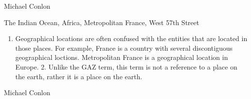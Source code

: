 \documentclass[letterpaper,10pt,english]{sphinxmanual}
\begin{document}
\begin{sphinxShadowBox}

\sphinxAtStartPar
Michael Conlon 
\end{sphinxShadowBox}

\begin{sphinxShadowBox}

\sphinxAtStartPar
The Indian Ocean, Africa, Metropolitan France, West 57th Street
\end{sphinxShadowBox}

\begin{sphinxShadowBox}
\begin{enumerate}
%
\item {} 
\sphinxAtStartPar
Geographical locations are often confused with the entities that are located in those places.  For example, France is a country with several discontiguous geographical loctions.  Metropolitan France is a geographical location in Europe.  2. Unlike the GAZ term, this term is not a reference to a place on the earth, rather it is a place on the earth.

\end{enumerate}
\end{sphinxShadowBox}

\begin{sphinxShadowBox}

\sphinxAtStartPar
{}
\end{sphinxShadowBox}

\begin{sphinxShadowBox}

\sphinxAtStartPar
Michael Conlon 
\end{sphinxShadowBox}

\begin{sphinxShadowBox}

\sphinxAtStartPar
{}
\end{sphinxShadowBox}
\begin{quote}
\label{\detokenize{doc-ORG_0000046:org-0000046}}\label{\detokenize{doc-ORG_0000046:geographic-point}}\label{\detokenize{doc-ORG_0000046:org-0000046}}
\ignorespaces \end{quote}
\end{document}
